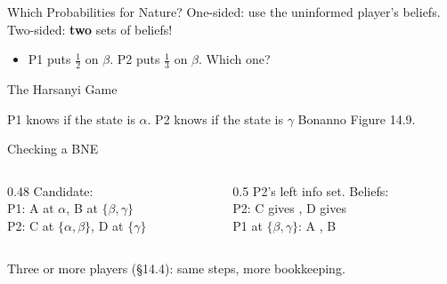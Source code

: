 \begin{frame}{Which Probabilities for Nature?}
One-sided: use the uninformed player's beliefs. Two-sided: \textbf{two} sets of beliefs!
\begin{itemize}
    \item P1 puts $\tfrac12$ on $\beta$. P2 puts $\tfrac13$ on $\beta$. Which one?
\end{itemize}
\bsk
{}
\bsk
{}
\vspace{-0.3in}
\end{frame}

\begin{frame}{The Harsanyi Game}
\centering
\twosidedtree
\bsk
\raggedright
P1 knows if the state is $\alpha$. P2 knows if the state is $\gamma$
\vfill
{\footnotesize Bonanno Figure 14.9.}
\vspace{-0.2in}
\end{frame}

\begin{frame}{Checking a BNE}
\centering
\twosidedtree[0.5]
\bsk
\raggedright
\begin{columns}[T]
\begin{column}{0.48\textwidth}
Candidate:\\
P1: A at $\alpha$, B at $\{\beta,\gamma\}$\\
P2: C at $\{\alpha,\beta\}$, D at $\{\gamma\}$
\end{column}
\begin{column}{0.5\textwidth}
P2's left info set. Beliefs: \underline{\hspace{0.8in}}\\[3pt]
P2: C gives \underline{\hspace{0.3in}}, D gives \underline{\hspace{0.3in}}\\[3pt]
P1 at $\{\beta,\gamma\}$: A \underline{\hspace{0.3in}}, B \underline{\hspace{0.3in}}
\end{column}
\end{columns}
\vfill
{\footnotesize Three or more players (\S14.4): same steps, more bookkeeping.}
\vspace{-0.2in}
\end{frame}

